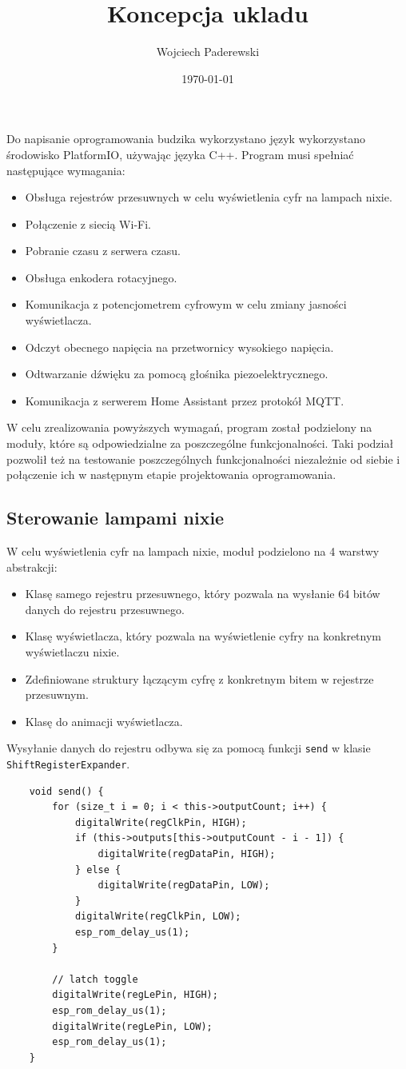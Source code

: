 \documentclass[../main.tex]{subfiles}
\author{Wojciech Paderewski}
\date{\today}
\title{Koncepcja ukladu}
\begin{document}
Do napisanie oprogramowania budzika wykorzystano język wykorzystano środowisko PlatformIO, używając języka C++.
Program musi spełniać następujące wymagania:
\begin{itemize}
  \item Obsługa rejestrów przesuwnych w celu wyświetlenia cyfr na lampach nixie.
  \item Połączenie z siecią Wi-Fi.
  \item Pobranie czasu z serwera czasu.
  \item Obsługa enkodera rotacyjnego.
  \item Komunikacja z potencjometrem cyfrowym w celu zmiany jasności wyświetlacza.
  \item Odczyt obecnego napięcia na przetwornicy wysokiego napięcia.
  \item Odtwarzanie dźwięku za pomocą głośnika piezoelektrycznego.
  \item Komunikacja z serwerem Home Assistant przez protokół MQTT.
\end{itemize}

W celu zrealizowania powyższych wymagań, program został podzielony na moduły, które są odpowiedzialne za poszczególne funkcjonalności.
Taki podział pozwolił też na testowanie poszczególnych funkcjonalności niezależnie od siebie i połączenie ich w następnym etapie projektowania oprogramowania.

\subsection{Sterowanie lampami nixie}
W celu wyświetlenia cyfr na lampach nixie, moduł podzielono na 4 warstwy abstrakcji:
\begin{itemize}
  \item Klasę samego rejestru przesuwnego, który pozwala na wysłanie 64 bitów danych do rejestru przesuwnego.
  \item Klasę wyświetlacza, który pozwala na wyświetlenie cyfry na konkretnym wyświetlaczu nixie.
  \item Zdefiniowane struktury łączącym cyfrę z konkretnym bitem w rejestrze przesuwnym.
  \item Klasę do animacji wyświetlacza.
\end{itemize}

Wysyłanie danych do rejestru odbywa się za pomocą funkcji \texttt{send} w klasie \texttt{ShiftRegisterExpander}.

\begin{verbatim}
    void send() {
        for (size_t i = 0; i < this->outputCount; i++) {
            digitalWrite(regClkPin, HIGH);
            if (this->outputs[this->outputCount - i - 1]) {
                digitalWrite(regDataPin, HIGH);
            } else {
                digitalWrite(regDataPin, LOW);
            }
            digitalWrite(regClkPin, LOW);
            esp_rom_delay_us(1);
        }

        // latch toggle
        digitalWrite(regLePin, HIGH);
        esp_rom_delay_us(1);
        digitalWrite(regLePin, LOW);
        esp_rom_delay_us(1);
    }
\end{verbatim}
\end{document}
